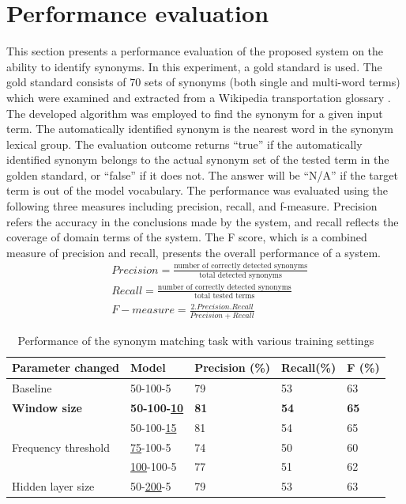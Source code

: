 \documentclass[Journal, BackFigs, DoubleSpace]{ascelike}%
\begin{document}
\section{Performance evaluation} \label{sec:eval_RoadLex}
This section presents a performance evaluation of the proposed system on the ability to identify synonyms. In this experiment, a gold standard is used. The gold standard consists of 70 sets of synonyms (both single and multi-word terms) which were examined and extracted from a Wikipedia transportation glossary \cite{wikipedia16}. The developed algorithm was employed to find the synonym for a given input term. The automatically identified synonym is the nearest word in the synonym lexical group. The evaluation outcome returns ``true'' if the automatically identified synonym belongs to the actual synonym set of the tested term in the golden standard, or ``false'' if it does not. The answer will be ``N/A'' if the target term is out of the model vocabulary. The performance was evaluated using the following three measures including precision, recall, and f-measure. Precision refers the accuracy in the conclusions made by the system, and recall reflects the coverage of domain terms of the system. The F score, which is a combined measure of precision and recall, presents the overall performance of a system. 
%
\begin{align} 
&Precision = \frac{\text{number of correctly detected synonyms}}{\text{total detected synonyms}}  \\
&Recall = \frac{\text{number of correctly detected synonyms}}{\text{total tested terms}}  \\ 
&F-measure = \frac{2.Precision.Recall}{Precision+Recall}
\end{align}
\begin{table} [b] 
	\caption{Performance of the synonym matching task with various training settings}
	\label{table:eval_syn_par_effect}
	\centering
	\small
	\renewcommand{\arraystretch}{1.25}
	\begin{tabular}{l l l l l }
		\hline
		\hline
		\textbf{Parameter changed} & \textbf{Model} & \textbf{Precision (\%)}  & \textbf{Recall(\%)} & \textbf{F (\%)}\\
		\hline
		Baseline	&	50-100-5	&79		&53		&63\\
		\hline
		\textbf{Window size}	&\textbf{50-100-\underline{10}}	&\textbf{81}		&\textbf{54}		&\textbf{65}\\
		&50-100-\underline{15}	&81		&54		&65\\
		\hline		
		Frequency threshold	&\underline{75}-100-5	&74		&50		&60\\
		&\underline{100}-100-5	&77		&51		&62\\
		\hline
		Hidden layer size	&50-\underline{200}-5	&79		&53		&63\\
		\hline
		\hline
	\end{tabular}
	\normalsize
\end{table}
\end{document}
